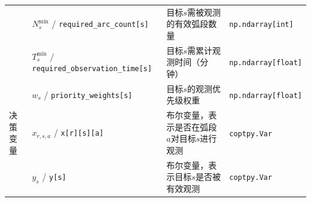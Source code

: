 \documentclass[openany,zihao=-4,UTF8]{ctexart}
\begin{document}
\begin{table}
\begin{tabularx}{\columnwidth}{llXl}
             & $N_s^{\min}$ / \texttt{required\_arc\_count[s]}        & 目标$s$需被观测的有效弧段数量                               & \texttt{np.ndarray[int]}   \\
             & $T_s^{\min}$ / \texttt{required\_observation\_time[s]} & 目标$s$需累计观测时间（分钟）                               & \texttt{np.ndarray[float]} \\
             & $w_s$ / \texttt{priority\_weights[s]}                  & 目标$s$的观测优先级权重                                  & \texttt{np.ndarray[float]} \\
        决策变量 & $x_{r,s,a}$ / \texttt{x[r][s][a]}                      & 布尔变量，表示是否在弧段$a$对目标$s$进行观测                      & \texttt{coptpy.Var}        \\
             & $y_s$ / \texttt{y[s]}                                  & 布尔变量，表示目标$s$是否被有效观测                            & \texttt{coptpy.Var}        \\
        \bottomrule
    \end{tabularx}
\end{table}
\end{document}

